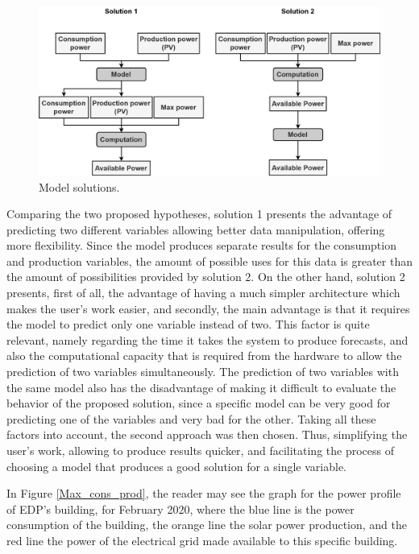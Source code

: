 \begin{figure}[h!]
    \centering
    \begin{center}
    \includegraphics[width=1\textwidth]{Images/Available.png}
    \caption{Model solutions.}
    \label{avsol}
    \end{center}
\end{figure}

Comparing the two proposed hypotheses, solution 1 presents the advantage of predicting two different variables allowing better data manipulation, offering more flexibility. Since the model produces separate results for the consumption and production variables, the amount of possible uses for this data is greater than the amount of possibilities provided by solution 2. On the other hand, solution 2 presents, first of all, the advantage of having a much simpler architecture which makes the user's work easier, and secondly, the main advantage is that it requires the model to predict only one variable instead of two. This factor is quite relevant, namely regarding the time it takes the system to produce forecasts, and also the computational capacity that is required from the hardware to allow the prediction of two variables simultaneously. The prediction of two variables with the same model also has the disadvantage of making it difficult to evaluate the behavior of the proposed solution, since a specific model can be very good for predicting one of the variables and very bad for the other. 
Taking all these factors into account, the second approach was then chosen. Thus, simplifying the user’s work, allowing to produce results quicker, and facilitating the process of choosing a model that produces a good solution for a single variable.


In Figure \ref{Max_cons_prod}, the reader may see the graph for the power profile of \ac{EDP}’s building, for February 2020, where the blue line is the power consumption of the building, the orange line the solar power production, and the red line the power of the electrical grid made available to this specific building.


